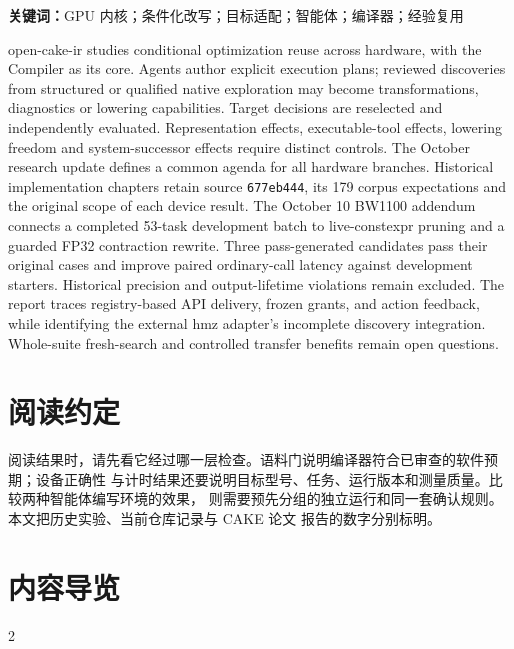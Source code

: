 \documentclass[UTF8,11pt,a4paper,fontset=none]{ctexart}
\newcommand{\code}[1]{\texttt{#1}}
\begin{document}
\noindent\textbf{关键词：}GPU 内核；条件化改写；目标适配；智能体；编译器；经验复用

\vspace{1.2em}
\par\vspace{0.35em}
{\small\raggedright{}\noindent
open-cake-ir studies conditional optimization reuse across hardware, with the Compiler as its core.
Agents author explicit execution plans; reviewed discoveries from structured or qualified native
exploration may become transformations, diagnostics or lowering capabilities. Target decisions are
reselected and independently evaluated. Representation effects, executable-tool effects, lowering
freedom and system-successor effects require distinct controls. The October research update defines
a common agenda for all hardware branches. Historical implementation chapters retain source
\code{677eb444}, its 179 corpus expectations and the original scope of each device result.
The October 10 BW1100 addendum connects a completed 53-task development batch to live-constexpr
pruning and a guarded FP32 contraction rewrite. Three pass-generated candidates pass their original
cases and improve paired ordinary-call latency against development starters. Historical precision
and output-lifetime violations remain excluded. The report traces registry-based API delivery, frozen grants, and action feedback,
while identifying the external hmz adapter's incomplete discovery integration. Whole-suite fresh-search
and controlled transfer benefits remain open questions.\par}

\vspace{1.6em}
\section*{阅读约定}
\begin{notebox}
阅读结果时，请先看它经过哪一层检查。语料门说明编译器符合已审查的软件预期；设备正确性
与计时结果还要说明目标型号、任务、运行版本和测量质量。比较两种智能体编写环境的效果，
则需要预先分组的独立运行和同一套确认规则。本文把历史实验、当前仓库记录与 CAKE 论文
报告的数字分别标明。
\end{notebox}
\clearpage
\vspace{0.5em}{\color{hair}\noindent\rule{\textwidth}{0.6pt}}\par
\section*{内容导览}
\setlength{\columnsep}{10mm}
\begin{multicols}{2}
\small
\makeatletter{}\makeatother
\end{multicols}
\clearpage
\end{document}
